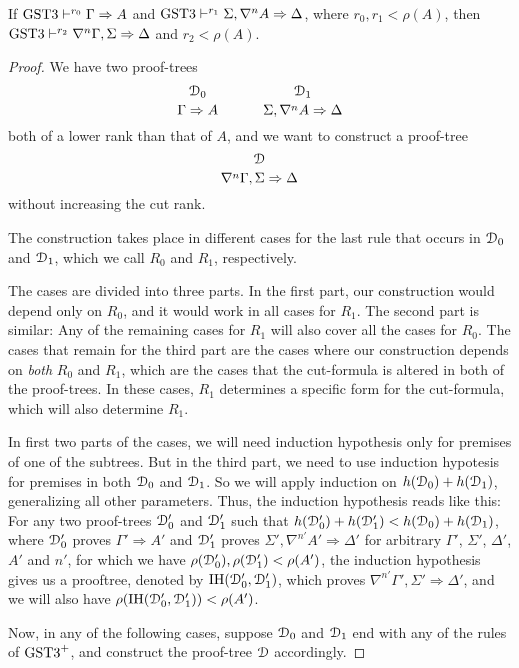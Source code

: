 \documentclass[10pt,a4paper]{amsart}
\begin{document}
\begin{thm}\label{thm:gstt-cut-reduction}
	If $\text{GST3} \vdash^{r_0} \Gamma \Rightarrow A$ and $\text{GST3} \vdash^{r_1} \Sigma , \nabla^n A \Rightarrow \Delta$, where $r_0, r_1 < \rho(A)$, then $\text{GST3} \vdash^{r_2} \nabla^n \Gamma, \Sigma \Rightarrow \Delta$ and $r_2 < \rho(A)$.
\end{thm}
\begin{proof}

	We have two proof-trees
	\[
		\genfrac{}{}{0pt}{}{\D_0}{\Gamma \Rightarrow A}
		\hspace{3em}
		\genfrac{}{}{0pt}{}{\D_1}{\Sigma, \nabla^n A \Rightarrow \Delta}
	\]
	both of a lower rank than that of $A$, and we want to construct a proof-tree
	\[\genfrac{}{}{0pt}{}{\D}{\nabla^n \Gamma, \Sigma \Rightarrow \Delta} \]
	without increasing the cut rank.

	The construction takes place in different cases for the last rule that occurs in $\mathcal{D}_0$ and $\mathcal{D}_1$, which we call $R_0$ and $R_1$, respectively.

	The cases are divided into three parts. In the first part, our construction would depend only on $R_0$, and it would work in all cases for $R_1$. The second part is similar: Any of the remaining cases for $R_1$ will also cover all the cases for $R_0$. The cases that remain for the third part are the cases where our construction depends on \emph{both} $R_0$ and $R_1$, which are the cases that the cut-formula is altered in both of the proof-trees. In these cases, $R_1$ determines a specific form for the cut-formula, which will also determine $R_1$.

	In first two parts of the cases, we will need induction hypothesis only for premises of one of the subtrees. But in the third part, we need to use induction hypotesis for premises in both $\mathcal{D}_0$ and $\mathcal{D}_1$. So we will apply induction on $h(\mathcal{D}_0) + h(\mathcal{D}_1)$, generalizing all other parameters. Thus, the induction hypothesis reads like this: For any two proof-trees $\mathcal{D}_0'$ and $\mathcal{D}_1'$ such that $h(\mathcal{D}_0') + h(\mathcal{D}_1') < h(\mathcal{D}_0) + h(\mathcal{D}_1)$, where $\mathcal{D}_0'$ proves $\Gamma' \Rightarrow A'$ and $\mathcal{D}_1'$ proves $\Sigma', \nabla^{n'} A'\Rightarrow \Delta'$ for arbitrary $\Gamma'$, $\Sigma'$, $\Delta'$, $A'$ and $n'$, for which we have $\rho(\mathcal{D}_0'),\rho(\mathcal{D}_1') < \rho(A')$, the induction hypothesis gives us a prooftree, denoted by $\text{IH}(\mathcal{D}_0', \mathcal{D}_1')$, which proves $\nabla^{n'}\Gamma', \Sigma' \Rightarrow \Delta'$, and we will also have $\rho(\text{IH}(\mathcal{D}_0', \mathcal{D}_1')) < \rho(A')$.

	Now, in any of the following cases, suppose $\mathcal{D}_0$ and $\mathcal{D}_1$ end with any of the rules of $\text{GST3}^+$, and construct the proof-tree $\mathcal{D}$ accordingly.


\end{proof}
\end{document}
